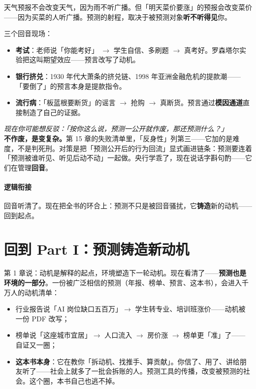 \documentclass[../../main2.tex]{subfiles}
\begin{document}
\begin{tcolorbox}[colback=green!5, title=\textit{生活类比}]
	天气预报不会改变天气，因为雨不听广播。但「明天菜价要涨」的预报会改变菜价——因为买菜的人听广播。预测的射程，取决于被预测对象\textbf{听不听得见}你。
\end{tcolorbox}

三个回音现场：

\begin{itemize}
	\item \textbf{考试}：老师说「你能考好」 $\rightarrow$ 学生自信、多刷题 $\rightarrow$ 真考好。罗森塔尔实验把这叫期望效应——预言改写了动机。
	\item \textbf{银行挤兑}：1930 年代大萧条的挤兑链、1998 年亚洲金融危机的提款潮——「要倒了」的预言本身是提款指令。
	\item \textbf{流行病}：「板蓝根要断货」的谣言 $\rightarrow$ 抢购 $\rightarrow$ 真断货。预言通过\textbf{模因通道}直接制造了自己的证据。
\end{itemize}

\begin{questionbox}
	\textit{现在你可能想反驳：「按你这么说，预测一公开就作废，那还预测什么？」}\\
	\textbf{不作废，是变复杂。}第 15 章的失败清单里，「反身性」列第三——它加的是难度，不是判死刑。对策是把「预测公开后的行为回流」显式画进链条：预测要连着「预测被谁听见、听见后动不动」一起做。央行学乖了，现在说话字斟句酌——它们在管理\textbf{回音}。
\end{questionbox}

\paragraph*{逻辑衔接}
	回音听清了。现在把全书的环合上：预测不只是被回音骚扰，它\textbf{铸造}新的动机——回到起点。

\section{回到 Part I：预测铸造新动机}

第 1 章说：动机是解释的起点，环境塑造下一轮动机。现在看清了——\textbf{预测也是环境的一部分}。一份被广泛相信的预测（年报、榜单、预言、这本书），会进入千万人的动机清单：

\begin{itemize}
	\item 行业报告说「AI 岗位缺口五百万」$\rightarrow$ 学生转专业、培训班涨价——动机被一份 PDF 改写；
	\item 榜单说「这座城市宜居」$\rightarrow$ 人口流入 $\rightarrow$ 房价涨 $\rightarrow$ 榜单更「准」了——自证又一圈；
	\item \textbf{这本书本身}：它在教你「拆动机、找推手、算贡献」。你信了、用了、讲给朋友听了——社会上就多了一批会拆账的人。预测工具的传播，改变被预测的社会。这个圈，本书自己也逃不掉。
\end{itemize}
\end{document}
